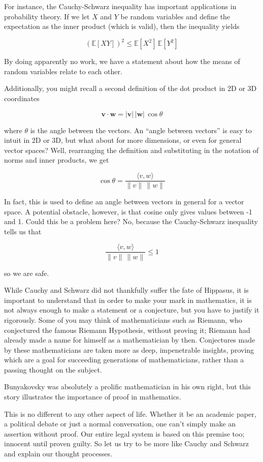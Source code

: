 \documentclass{article}
\begin{document}
For instance, the Cauchy-Schwarz inequality has important applications in probability theory. If we let $X$ and $Y$ be random variables and define the expectation as the inner product (which is valid), then the inequality yields

\[
(\mathbb{E}[XY])^2 \leq \mathbb{E}[X^2]\,\mathbb{E}[Y^2]
\]

By doing apparently no work, we have a statement about how the means of random variables relate to each other.

Additionally, you might recall a second definition of the dot product in 2D or 3D coordinates

\[
\mathbf{v} \cdot \mathbf{w} = |\mathbf{v}|\,|\mathbf{w}|\,\cos\theta
\]

where $\theta$ is the angle between the vectors. An “angle between vectors” is easy to intuit in 2D or 3D, but what about for more dimensions, or even for general vector spaces? Well, rearranging the definition and substituting in the notation of norms and inner products, we get

\[
\cos\theta = \frac{\langle v, w \rangle}{\|v\|\,\|w\|}
\]

In fact, this is used to define an angle between vectors in general for a vector space. A potential obstacle, however, is that cosine only gives values between -1 and 1. Could this be a problem here? No, because the Cauchy-Schwarz inequality tells us that

\[
\frac{\langle v, w \rangle}{\|v\|\,\|w\|} \leq 1
\]

so we are safe.

While Cauchy and Schwarz did not thankfully suffer the fate of Hippasus, it is important to understand that in order to make your mark in mathematics, it is not always enough to make a statement or a conjecture, but you have to justify it rigorously. Some of you may think of mathematicians such as Riemann, who conjectured the famous Riemann Hypothesis, without proving it; Riemann had already made a name for himself as a mathematician by then. Conjectures made by these mathematicians are taken more as deep, impenetrable insights, proving which are a goal for succeeding generations of mathematicians, rather than a passing thought on the subject.

Bunyakovsky was absolutely a prolific mathematician in his own right, but this story illustrates the importance of proof in mathematics.

This is no different to any other aspect of life. Whether it be an academic paper, a political debate or just a normal conversation, one can't simply make an assertion without proof. Our entire legal system is based on this premise too; innocent until proven guilty. So let us try to be more like Cauchy and Schwarz and explain our thought processes.
\end{document}
